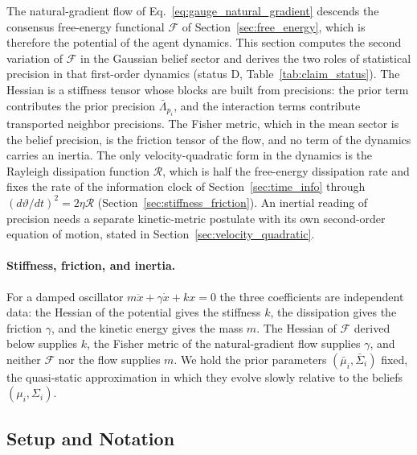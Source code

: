 \documentclass[11pt]{article}
\begin{document}
The natural-gradient flow of Eq.~\eqref{eq:gauge_natural_gradient} descends the consensus free-energy functional $\mathcal{F}$ of Section~\ref{sec:free_energy}, which is therefore the potential of the agent dynamics. This section computes the second variation of $\mathcal{F}$ in the Gaussian belief sector and derives the two roles of statistical precision in that first-order dynamics (status D, Table~\ref{tab:claim_status}). The Hessian is a stiffness tensor whose blocks are built from precisions: the prior term contributes the prior precision $\bar{\Lambda}_{p_i}$, and the interaction terms contribute transported neighbor precisions. The Fisher metric, which in the mean sector is the belief precision, is the friction tensor of the flow, and no term of the dynamics carries an inertia. The only velocity-quadratic form in the dynamics is the Rayleigh dissipation function $\mathcal{R}$, which is half the free-energy dissipation rate and fixes the rate of the information clock of Section~\ref{sec:time_info} through $(d\vartheta/dt)^2 = 2\eta\mathcal{R}$ (Section~\ref{sec:stiffness_friction}). An inertial reading of precision needs a separate kinetic-metric postulate with its own second-order equation of motion, stated in Section~\ref{sec:velocity_quadratic}.

\paragraph{Stiffness, friction, and inertia.} For a damped oscillator $m\ddot{x} + \gamma\dot{x} + kx = 0$ the three coefficients are independent data: the Hessian of the potential gives the stiffness $k$, the dissipation gives the friction $\gamma$, and the kinetic energy gives the mass $m$. The Hessian of $\mathcal{F}$ derived below supplies $k$, the Fisher metric of the natural-gradient flow supplies $\gamma$, and neither $\mathcal{F}$ nor the flow supplies $m$. We hold the prior parameters $(\bar{\mu}_i, \bar{\Sigma}_i)$ fixed, the quasi-static approximation in which they evolve slowly relative to the beliefs $(\mu_i, \Sigma_i)$.

\subsection{Setup and Notation}
\end{document}
